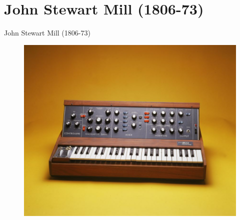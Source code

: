 \documentclass{beamer}
\begin{document}
\section{John Stewart Mill (1806-73)}

\begin{frame}{John Stewart Mill (1806-73)}

\begin{figure}[htpb]
	\centering
	\includegraphics[width=0.8\linewidth]{../img/synth.jpg}
\end{figure}
	
\end{frame}
\end{document}
